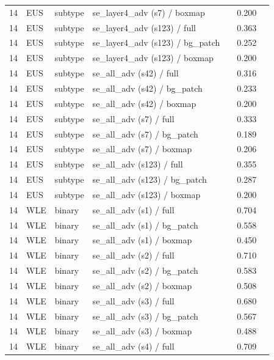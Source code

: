 \begin{longtable}{cL{1.1cm}L{1.5cm}L{5.6cm}ccc}
14 & EUS & subtype & se\_layer4\_adv (s7) / boxmap & \nl{} & 0.200 & \nl{} \\
14 & EUS & subtype & se\_layer4\_adv (s123) / full & \nl{} & 0.363 & \nl{} \\
14 & EUS & subtype & se\_layer4\_adv (s123) / bg\_patch & \nl{} & 0.252 & \nl{} \\
14 & EUS & subtype & se\_layer4\_adv (s123) / boxmap & \nl{} & 0.200 & \nl{} \\
14 & EUS & subtype & se\_all\_adv (s42) / full & \nl{} & 0.316 & \nl{} \\
14 & EUS & subtype & se\_all\_adv (s42) / bg\_patch & \nl{} & 0.233 & \nl{} \\
14 & EUS & subtype & se\_all\_adv (s42) / boxmap & \nl{} & 0.200 & \nl{} \\
14 & EUS & subtype & se\_all\_adv (s7) / full & \nl{} & 0.333 & \nl{} \\
14 & EUS & subtype & se\_all\_adv (s7) / bg\_patch & \nl{} & 0.189 & \nl{} \\
14 & EUS & subtype & se\_all\_adv (s7) / boxmap & \nl{} & 0.206 & \nl{} \\
14 & EUS & subtype & se\_all\_adv (s123) / full & \nl{} & 0.355 & \nl{} \\
14 & EUS & subtype & se\_all\_adv (s123) / bg\_patch & \nl{} & 0.287 & \nl{} \\
14 & EUS & subtype & se\_all\_adv (s123) / boxmap & \nl{} & 0.200 & \nl{} \\
14 & WLE & binary & se\_all\_adv (s1) / full & \nl{} & 0.704 & \nl{} \\
14 & WLE & binary & se\_all\_adv (s1) / bg\_patch & \nl{} & 0.558 & \nl{} \\
14 & WLE & binary & se\_all\_adv (s1) / boxmap & \nl{} & 0.450 & \nl{} \\
14 & WLE & binary & se\_all\_adv (s2) / full & \nl{} & 0.710 & \nl{} \\
14 & WLE & binary & se\_all\_adv (s2) / bg\_patch & \nl{} & 0.583 & \nl{} \\
14 & WLE & binary & se\_all\_adv (s2) / boxmap & \nl{} & 0.508 & \nl{} \\
14 & WLE & binary & se\_all\_adv (s3) / full & \nl{} & 0.680 & \nl{} \\
14 & WLE & binary & se\_all\_adv (s3) / bg\_patch & \nl{} & 0.567 & \nl{} \\
14 & WLE & binary & se\_all\_adv (s3) / boxmap & \nl{} & 0.488 & \nl{} \\
14 & WLE & binary & se\_all\_adv (s4) / full & \nl{} & 0.709 & \nl{} \\

\end{longtable}
